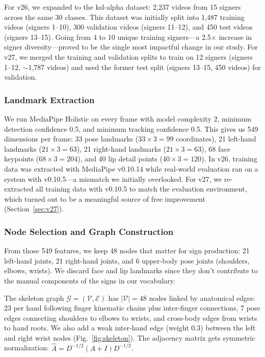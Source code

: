 \documentclass[conference]{IEEEtran}
\begin{document}
For v26, we expanded to the ksl-alpha dataset: 2,237 videos from 15 signers across the same 30 classes. This dataset was initially split into 1,487 training videos (signers 1--10), 300 validation videos (signers 11--12), and 450 test videos (signers 13--15). Going from 4 to 10 unique training signers---a 2.5$\times$ increase in signer diversity---proved to be the single most impactful change in our study. For v27, we merged the training and validation splits to train on 12 signers (signers 1--12, ${\sim}$1,787 videos) and used the former test split (signers 13--15, 450 videos) for validation.

\subsubsection{Landmark Extraction}
We run MediaPipe Holistic on every frame with model complexity 2, minimum detection confidence 0.5, and minimum tracking confidence 0.5. This gives us 549 dimensions per frame: 33 pose landmarks ($33 \times 3 = 99$ coordinates), 21 left-hand landmarks ($21 \times 3 = 63$), 21 right-hand landmarks ($21 \times 3 = 63$), 68 face keypoints ($68 \times 3 = 204$), and 40 lip detail points ($40 \times 3 = 120$). In v26, training data was extracted with MediaPipe v0.10.14 while real-world evaluation ran on a system with v0.10.5---a mismatch we initially overlooked. For v27, we re-extracted all training data with v0.10.5 to match the evaluation environment, which turned out to be a meaningful source of free improvement (Section~\ref{sec:v27}).

\subsubsection{Node Selection and Graph Construction}
From those 549 features, we keep 48 nodes that matter for sign production: 21 left-hand joints, 21 right-hand joints, and 6 upper-body pose joints (shoulders, elbows, wrists). We discard face and lip landmarks since they don't contribute to the manual components of the signs in our vocabulary.

The skeleton graph $\mathcal{G} = (\mathcal{V}, \mathcal{E})$ has $|\mathcal{V}| = 48$ nodes linked by anatomical edges: 23 per hand following finger kinematic chains plus inter-finger connections, 7 pose edges connecting shoulders to elbows to wrists, and cross-body edges from wrists to hand roots. We also add a weak inter-hand edge (weight 0.3) between the left and right wrist nodes (Fig.~\ref{fig:skeleton}). The adjacency matrix gets symmetric normalization: $\hat{A} = D^{-1/2}(A + I)D^{-1/2}$.
\end{document}
